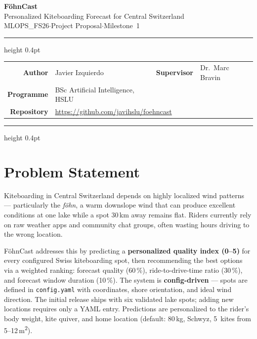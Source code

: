 \documentclass[11pt,a4paper]{article}
\begin{document}
\begin{center}
{\Large\bfseries F\"ohnCast}\\[1pt]
{\large Personalized Kiteboarding Forecast for Central Switzerland}\\[3pt]
{\small MLOPS\_FS26\enspace$\cdot$\enspace Project Proposal\enspace$\cdot$\enspace Milestone~1}
\end{center}

\smallskip
\hrule height 0.4pt
\smallskip

\begin{center}
\footnotesize
\renewcommand{\arraystretch}{1.2}
\begin{tabular}{@{}rl@{\qquad}rl@{}}
\textbf{Author}      & Javier Izquierdo          & \textbf{Supervisor}  & Dr.\ Marc Bravin \\
\textbf{Programme}    & BSc Artificial Intelligence, HSLU & & \\[3pt]
\textbf{Repository}   & \multicolumn{3}{l}{\url{https://github.com/javihslu/foehncast}} \\
\end{tabular}
\end{center}

\smallskip
\hrule height 0.4pt
\smallskip

\section{Problem Statement}

Kiteboarding in Central Switzerland depends on highly localized wind
patterns --- particularly the \emph{f\"ohn}, a warm downslope wind that
can produce excellent conditions at one lake while a spot 30\,km away
remains flat. Riders currently rely on raw weather apps and community
chat groups, often wasting hours driving to the wrong location.

F\"ohnCast addresses this by predicting a \textbf{personalized quality
index (0--5)} for every configured Swiss kiteboarding spot, then
recommending the best options via a weighted ranking: forecast quality
(60\,\%), ride-to-drive-time ratio (30\,\%), and forecast window
duration (10\,\%). The system is \textbf{config-driven} --- spots are
defined in \texttt{config.yaml} with coordinates, shore orientation,
and ideal wind direction. The initial release ships with six validated
lake spots; adding new locations requires only a YAML entry.
Predictions are personalized to the rider's body weight, kite quiver,
and home location (default: 80\,kg, Schwyz, 5~kites from
5--12\,m\textsuperscript{2}).
\end{document}
